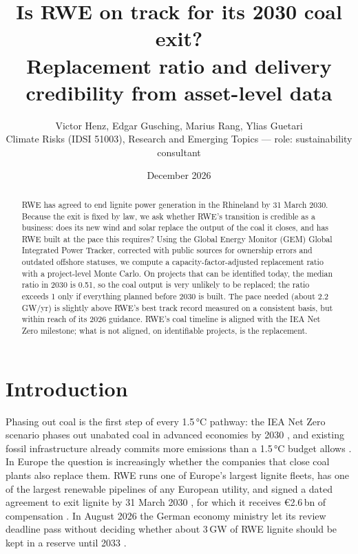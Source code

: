 \documentclass[11pt,a4paper]{article}
\title{\textbf{Is RWE on track for its 2030 coal exit?}\\[2pt]
\large Replacement ratio and delivery credibility from asset-level data}
\author{Victor Henz, Edgar Gusching, Marius Rang, Ylias Guetari\\[2pt]
\small Climate Risks (IDSI 51003), Research and Emerging Topics --- role: sustainability consultant}
\date{December 2026}
\begin{document}
\maketitle

\begin{abstract}
RWE has agreed to end lignite power generation in the Rhineland by 31 March 2030. Because the exit is fixed by law, we ask whether RWE's transition is credible as a business: does its new wind and solar replace the output of the coal it closes, and has RWE built at the pace this requires? Using the Global Energy Monitor (GEM) Global Integrated Power Tracker, corrected with public sources for ownership errors and outdated offshore statuses, we compute a capacity-factor-adjusted replacement ratio with a project-level Monte Carlo. On projects that can be identified today, the median ratio in 2030 is 0.51, so the coal output is very unlikely to be replaced; the ratio exceeds 1 only if everything planned before 2030 is built. The pace needed (about 2.2\,GW/yr) is slightly above RWE's best track record measured on a consistent basis, but within reach of its 2026 guidance. RWE's coal timeline is aligned with the IEA Net Zero milestone; what is not aligned, on identifiable projects, is the replacement.
\end{abstract}

\section{Introduction}
Phasing out coal is the first step of every 1.5\,°C pathway: the IEA Net Zero scenario phases out unabated coal in advanced economies by 2030 \cite{iea2021}, and existing fossil infrastructure already commits more emissions than a 1.5\,°C budget allows \cite{tong2019}. In Europe the question is increasingly whether the companies that close coal plants also replace them. RWE runs one of Europe's largest lignite fleets, has one of the largest renewable pipelines of any European utility, and signed a dated agreement to exit lignite by 31 March 2030 \cite{bmwk2022}, for which it receives \euro2.6\,bn of compensation \cite{ec2023}. In August 2026 the German economy ministry let its review deadline pass without deciding whether about 3\,GW of RWE lignite should be kept in a reserve until 2033 \cite{cleanthinking2026}.
\end{document}
